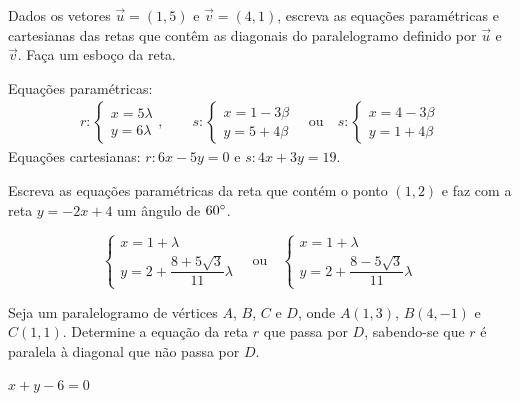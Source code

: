 \documentclass[12pt]{exam}
\begin{document}
\vspace{.3cm}

\questao{} Dados os vetores $\vec{u} = (1,5)$ e $\vec{v} = (4,1)$, escreva as equações paramétricas e cartesianas das retas que contêm as diagonais do paralelogramo definido por $\vec{u}$ e $\vec{v}$. Faça um esboço da reta.
\begin{solucao}
    Equações paramétricas:
    \begin{align*}
        r: \begin{cases}
               x = 5\lambda \\
               y = 6\lambda
           \end{cases}, \qquad
        s: \begin{cases}
               x = 1 - 3\beta \\
               y = 5 + 4\beta
           \end{cases}\quad\mbox{ou}\quad s: \begin{cases}
                                                 x = 4 - 3\beta \\
                                                 y = 1 + 4\beta
                                             \end{cases}
    \end{align*}
    Equações cartesianas: $r: 6x - 5y = 0$ e $s: 4x + 3y = 19$.
\end{solucao}

\vspace{.3cm}

\questao{} Escreva as equações paramétricas da reta que contém o ponto $(1,2)$ e faz com a reta $y = -2x + 4$ um ângulo de $60\degree$.
\begin{solucao}
    \[
        \begin{cases}
            x = 1 + \lambda \\
            y = 2 + \dfrac{8 + 5\sqrt{3}}{11}\lambda
        \end{cases}\quad\mbox{ou}\quad
        \begin{cases}
            x = 1 + \lambda \\
            y = 2 + \dfrac{8 - 5\sqrt{3}}{11}\lambda
        \end{cases}
    \]
\end{solucao}

\vspace{.3cm}

\questao{} Seja um paralelogramo de vértices $A$, $B$, $C$ e $D$, onde $A(1, 3)$, $B(4,-1)$ e $C(1,1)$. Determine a equação da reta $r$ que passa por $D$, sabendo-se que $r$ é paralela à diagonal que não passa por $D$.
\begin{solucao}
    $x + y - 6 = 0$
\end{solucao}
\end{document}
